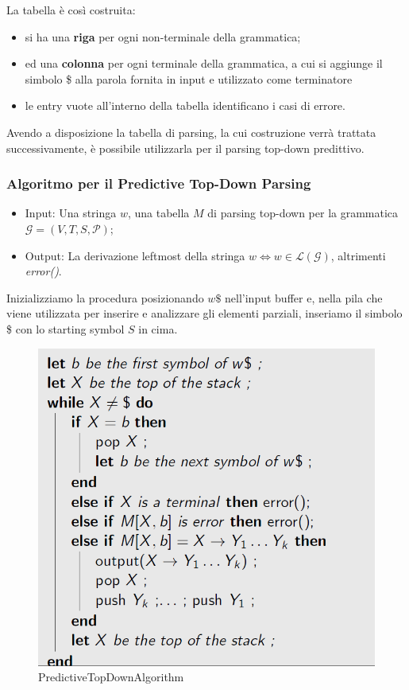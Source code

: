 \documentclass[class=book, crop=false, oneside, 12pt]{standalone}
\begin{document}
La tabella è così costruita:
\begin{itemize}
    \item si ha una \textbf{riga} per ogni non-terminale della grammatica;
    \item ed una \textbf{colonna} per ogni terminale della grammatica, a cui si aggiunge il simbolo \$ alla parola fornita in input e utilizzato come terminatore
    \item le entry vuote all'interno della tabella identificano i casi di errore.
\end{itemize}

Avendo a disposizione la tabella di parsing, la cui costruzione verrà trattata successivamente, è possibile utilizzarla per il parsing top-down predittivo.

\subsubsection{Algoritmo per il Predictive Top-Down Parsing}
\begin{itemize}
    \item Input: Una stringa \(w\), una tabella \(M\) di parsing top-down per la grammatica \(\mathcal{G} = (V, T, S, \mathcal{P})\);
    \item Output: La derivazione leftmost della stringa \(w \iff w \in \mathcal{L(G)}\), altrimenti \emph{error()}.
\end{itemize}
Inizializziamo la procedura posizionando \(w\$\) nell'input buffer e, nella pila che viene utilizzata per inserire e analizzare gli elementi parziali, inseriamo il simbolo \$ con lo starting symbol \(S\) in cima.
\begin{figure}[H]
    \centering
    \includegraphics[width=.7\textwidth,keepaspectratio]{PredictiveTopDownAlgorithm.png}
    \caption{PredictiveTopDownAlgorithm}
    \label{PredictiveTopDownAlgorithm}
\end{figure}
\end{document}
